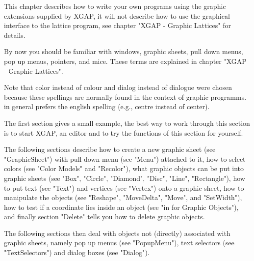 \def\XGAP{{\sf XGAP}}

This chapter describes how  to write your own  programs using the graphic
extensions supplied by  {\XGAP},  it will  not describe  how to use   the
graphical interface  to the lattice program,  see chapter "XGAP - Graphic
Lattices" for details.

By now  you should be  familiar  with windows,  graphic sheets, pull down
menus, pop up  menus, pointers, and mice.   These terms are explained  in
chapter "XGAP - Graphic Lattices".

Note that color  instead  of colour  and dialog instead  of dialogue were
chosen  because these spellings  are  normally found   in the context  of
graphic programms.  {\GAP} in general prefers the english spelling (e.g.,
centre instead of center).

The  first section gives  a small example, the best   way to work through
this section is to start  {\XGAP}, an editor  and to try the functions of
this section for yourself.

The following sections  describe how to create a  new graphic sheet  (see
"GraphicSheet") with  pull down menu (see  "Menu") attached to it, how to
select colors  (see "Color Models"  and "Recolor"), what  graphic objects
can be  put into graphic sheets  (see "Box", "Circle", "Diamond", "Disc",
"Line", "Rectangle"),  how to  put  text (see  "Text") and vertices  (see
"Vertex")   onto a graphic sheet,   how  to manipulate   the objects (see
"Reshape",  "MoveDelta", "Move",  and   "SetWidth"), how  to  test  if  a
coordinate lies  inside  an object  (see "in  for Graphic  Objects"), and
finally section "Delete" tells you how to delete graphic objects.

The  following sections then  deal with objects  not (directly) associated
with graphic  sheets, namely    pop  up menus (see    "PopupMenu"),  text
selectors (see "TextSelectors") and dialog boxes (see "Dialog").

